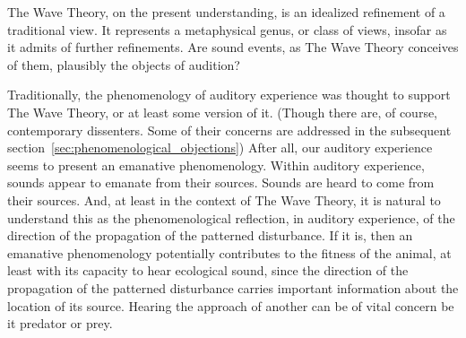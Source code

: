 The Wave Theory, on the present understanding, is an idealized refinement of a traditional view. It represents a metaphysical genus, or class of views, insofar as it admits of further refinements. Are sound events, as The Wave Theory conceives of them, plausibly the objects of audition?

Traditionally, the phenomenology of auditory experience was thought to support The Wave Theory, or at least some version of it. (Though there are, of course, contemporary dissenters. Some of their concerns are addressed in the subsequent section~\ref{sec:phenomenological_objections}) After all, our auditory experience seems to present an emanative phenomenology. Within auditory experience, sounds appear to emanate from their sources. Sounds are heard to come from their sources. And, at least in the context of The Wave Theory, it is natural to understand this as the phenomenological reflection, in auditory experience, of the direction of the propagation of the patterned disturbance. If it is, then an emanative phenomenology potentially contributes to the fitness of the animal, at least with its capacity to hear ecological sound, since the direction of the propagation of the patterned disturbance carries important information about the location of its source. Hearing the approach of another can be of vital concern be it predator or prey.

